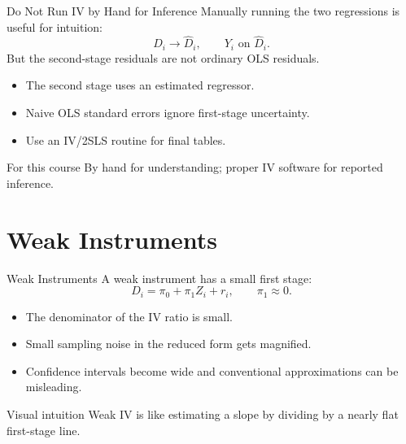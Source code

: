 \documentclass[11pt,aspectratio=169]{beamer}
\newcommand{\derivbutton}[1]{\vspace{0.4em}\hfill\hyperlink{app:#1}{\beamerbutton{Appendix details}}}
\begin{document}
\begin{frame}{Do Not Run IV by Hand for Inference}
  Manually running the two regressions is useful for intuition:
  \[
    D_i \rightarrow \hat{D}_i,
    \qquad
    Y_i \text{ on } \hat{D}_i.
  \]
  But the second-stage residuals are not ordinary OLS residuals.

  \begin{itemize}
    \item The second stage uses an estimated regressor.
    \item Naive OLS standard errors ignore first-stage uncertainty.
    \item Use an IV/2SLS routine for final tables.
  \end{itemize}

  \begin{block}{For this course}
    By hand for understanding; proper IV software for reported inference.
  \end{block}
\end{frame}

\section{Weak Instruments}

\begin{frame}{Weak Instruments}
  \hypertarget{main:weak}{}
  A weak instrument has a small first stage:
  \[
    D_i = \pi_0 + \pi_1 Z_i + r_i,
    \qquad
    \pi_1 \approx 0.
  \]

  \begin{itemize}
    \item The denominator of the IV ratio is small.
    \item Small sampling noise in the reduced form gets magnified.
    \item Confidence intervals become wide and conventional approximations can be misleading.
  \end{itemize}

  \begin{block}{Visual intuition}
    Weak IV is like estimating a slope by dividing by a nearly flat first-stage line.
  \end{block}

  \derivbutton{weak-proof}
\end{frame}
\end{document}
